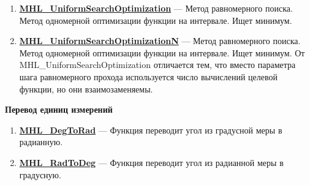 \documentclass[a4paper,12pt]{article}
\begin{document}
\begin{enumerate}
\item \textbf{\hyperref[MHL_UniformSearchOptimization]{MHL\_UniformSearchOptimization}} --- Метод равномерного поиска. Метод одномерной оптимизации функции на интервале. Ищет минимум.

\item \textbf{\hyperref[MHL_UniformSearchOptimizationN]{MHL\_UniformSearchOptimizationN}} --- Метод равномерного поиска. Метод одномерной оптимизации функции на интервале. Ищет минимум. От MHL\_UniformSearchOptimization отличается тем, что вместо параметра шага равномерного прохода используется число вычислений целевой функции, но они взаимозаменяемы.

\end{enumerate}

\textbf{Перевод единиц измерений}
\begin{enumerate}

\item \textbf{\hyperref[MHL_DegToRad]{MHL\_DegToRad}} --- Функция переводит угол из градусной меры в радианную.

\item \textbf{\hyperref[MHL_RadToDeg]{MHL\_RadToDeg}} --- Функция переводит угол из радианной меры в градусную.

\end{enumerate}
\end{document}
